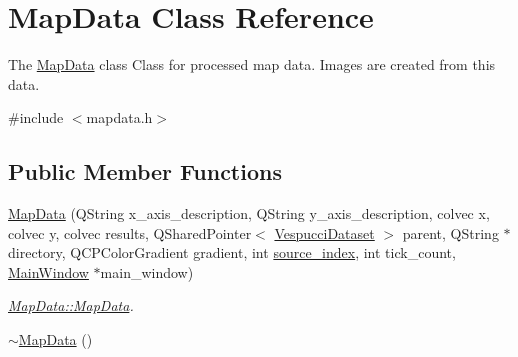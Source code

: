 \hypertarget{class_map_data}{\section{Map\+Data Class Reference}
\label{class_map_data}
}


The \hyperlink{class_map_data}{Map\+Data} class Class for processed map data. Images are created from this data.  




{\ttfamily \#include $<$mapdata.\+h$>$}

\subsection*{Public Member Functions}
\begin{DoxyCompactItemize}
\item 
\hyperlink{class_map_data_ab50af013c711ed6ae81b3a0f22d3e83a}{Map\+Data} (Q\+String x\+\_\+axis\+\_\+description, Q\+String y\+\_\+axis\+\_\+description, colvec x, colvec y, colvec results, Q\+Shared\+Pointer$<$ \hyperlink{class_vespucci_dataset}{Vespucci\+Dataset} $>$ parent, Q\+String $\ast$directory, Q\+C\+P\+Color\+Gradient gradient, int \hyperlink{class_map_data_a24c45edae66512b7a7b7d62be38b91f1}{source\+\_\+index}, int tick\+\_\+count, \hyperlink{class_main_window}{Main\+Window} $\ast$main\+\_\+window)
\begin{DoxyCompactList}\small\item\em \hyperlink{class_map_data_ab50af013c711ed6ae81b3a0f22d3e83a}{Map\+Data\+::\+Map\+Data}. \end{DoxyCompactList}\item 
\hypertarget{class_map_data_afc3e096cf252c30641055ea4eaaab410}{\hyperlink{class_map_data_afc3e096cf252c30641055ea4eaaab410}{$\sim$\+Map\+Data} ()}\label{class_map_data_afc3e096cf252c30641055ea4eaaab410}


\end{DoxyCompactItemize}

